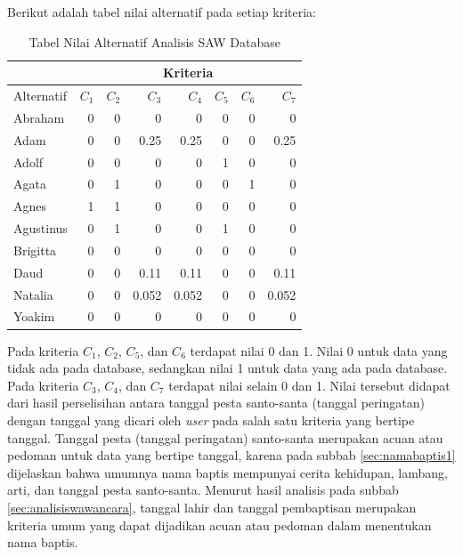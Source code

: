 Berikut adalah tabel nilai alternatif pada setiap kriteria:


\begin{table}[H]
	\centering
	\caption{Tabel Nilai Alternatif Analisis SAW Database}
		\begin{tabular}{|l|r|r|r|r|r|r|r|} \hline
    &
    \multicolumn{7}{|c|}{Kriteria} \\
		\hline
    Alternatif    & $C_{1}$ & $C_{2}$ & $C_{3}$ & $C_{4}$ & $C_{5}$ & $C_{6}$ & $C_{7}$ \\
    \hline
    Abraham     & 0&0&0&0&0&0&0     \\ \hline
    Adam	      & 0&0&0.25&0.25&0&0&0.25    \\ \hline
    Adolf       & 0&0&0&0&1&0&0      \\ \hline
    Agata       & 0&1&0&0&0&1&0  \\ \hline
		Agnes    		& 1&1&0&0&0&0&0     \\ \hline
    Agustinus	  & 0&1&0&0&1&0&0    \\ \hline
    Brigitta    & 0&0&0&0&0&0&0      \\ \hline
    Daud       	& 0&0&0.11&0.11&0&0&0.11  \\ \hline
		Natalia     & 0&0&0.052&0.052&0&0&0.052      \\ \hline
    Yoakim      & 0&0&0&0&0&0&0  \\ \hline
				\end{tabular}
	\label{table:pencariantgl}
\end{table}



Pada kriteria $C_{1}$, $C_{2}$, $C_{5}$, dan $C_{6}$ terdapat nilai 0 dan 1. Nilai 0 untuk data yang tidak ada pada database, sedangkan nilai 1 untuk data yang ada pada database.	Pada kriteria $C_{3}$, $C_{4}$, dan $C_{7}$ terdapat nilai selain 0 dan 1. Nilai tersebut didapat dari hasil perselisihan antara tanggal pesta santo-santa (tanggal peringatan) dengan tanggal yang dicari oleh \textit{user} pada salah satu kriteria yang bertipe tanggal. Tanggal pesta (tanggal peringatan) santo-santa merupakan acuan atau pedoman untuk data yang bertipe tanggal, karena pada subbab \ref{sec:namabaptis1} dijelaskan bahwa umumnya nama baptis mempunyai cerita kehidupan, lambang, arti, dan tanggal pesta santo-santa. Menurut hasil analisis pada subbab \ref{sec:analisiswawancara}, tanggal lahir dan tanggal pembaptisan merupakan kriteria umum yang dapat dijadikan acuan atau pedoman dalam menentukan nama baptis.



